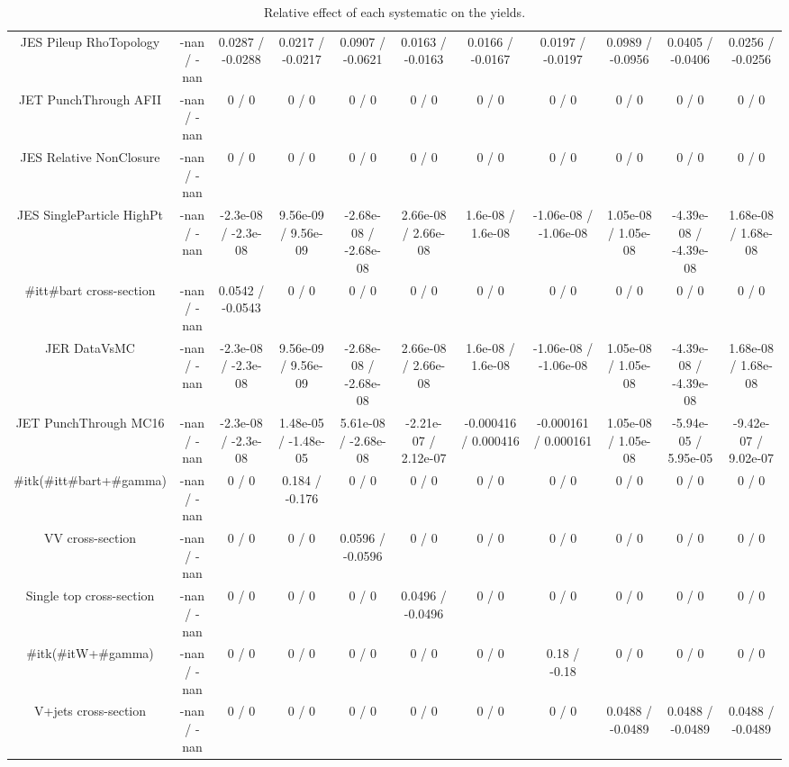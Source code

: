 \begin{table}[htbp]
\begin{center}
\begin{tabular}{|c|c|c|c|c|c|c|c|c|c|c|}
  JES Pileup RhoTopology & -nan / -nan & 0.0287 / -0.0288 & 0.0217 / -0.0217 & 0.0907 / -0.0621 & 0.0163 / -0.0163 & 0.0166 / -0.0167 & 0.0197 / -0.0197 & 0.0989 / -0.0956 & 0.0405 / -0.0406 & 0.0256 / -0.0256 \\ 
  JET PunchThrough AFII & -nan / -nan & 0 / 0 & 0 / 0 & 0 / 0 & 0 / 0 & 0 / 0 & 0 / 0 & 0 / 0 & 0 / 0 & 0 / 0 \\ 
  JES Relative NonClosure & -nan / -nan & 0 / 0 & 0 / 0 & 0 / 0 & 0 / 0 & 0 / 0 & 0 / 0 & 0 / 0 & 0 / 0 & 0 / 0 \\ 
  JES SingleParticle HighPt & -nan / -nan & -2.3e-08 / -2.3e-08 & 9.56e-09 / 9.56e-09 & -2.68e-08 / -2.68e-08 & 2.66e-08 / 2.66e-08 & 1.6e-08 / 1.6e-08 & -1.06e-08 / -1.06e-08 & 1.05e-08 / 1.05e-08 & -4.39e-08 / -4.39e-08 & 1.68e-08 / 1.68e-08 \\ 
  #it{t#bar{t}} cross-section & -nan / -nan & 0.0542 / -0.0543 & 0 / 0 & 0 / 0 & 0 / 0 & 0 / 0 & 0 / 0 & 0 / 0 & 0 / 0 & 0 / 0 \\ 
  JER DataVsMC & -nan / -nan & -2.3e-08 / -2.3e-08 & 9.56e-09 / 9.56e-09 & -2.68e-08 / -2.68e-08 & 2.66e-08 / 2.66e-08 & 1.6e-08 / 1.6e-08 & -1.06e-08 / -1.06e-08 & 1.05e-08 / 1.05e-08 & -4.39e-08 / -4.39e-08 & 1.68e-08 / 1.68e-08 \\ 
  JET PunchThrough MC16 & -nan / -nan & -2.3e-08 / -2.3e-08 & 1.48e-05 / -1.48e-05 & 5.61e-08 / -2.68e-08 & -2.21e-07 / 2.12e-07 & -0.000416 / 0.000416 & -0.000161 / 0.000161 & 1.05e-08 / 1.05e-08 & -5.94e-05 / 5.95e-05 & -9.42e-07 / 9.02e-07 \\ 
  #it{k}(#it{t#bar{t}+#gamma}) & -nan / -nan & 0 / 0 & 0.184 / -0.176 & 0 / 0 & 0 / 0 & 0 / 0 & 0 / 0 & 0 / 0 & 0 / 0 & 0 / 0 \\ 
  VV cross-section & -nan / -nan & 0 / 0 & 0 / 0 & 0.0596 / -0.0596 & 0 / 0 & 0 / 0 & 0 / 0 & 0 / 0 & 0 / 0 & 0 / 0 \\ 
  Single top cross-section & -nan / -nan & 0 / 0 & 0 / 0 & 0 / 0 & 0.0496 / -0.0496 & 0 / 0 & 0 / 0 & 0 / 0 & 0 / 0 & 0 / 0 \\ 
  #it{k}(#it{W+#gamma}) & -nan / -nan & 0 / 0 & 0 / 0 & 0 / 0 & 0 / 0 & 0 / 0 & 0.18 / -0.18 & 0 / 0 & 0 / 0 & 0 / 0 \\ 
  V+jets cross-section & -nan / -nan & 0 / 0 & 0 / 0 & 0 / 0 & 0 / 0 & 0 / 0 & 0 / 0 & 0.0488 / -0.0489 & 0.0488 / -0.0489 & 0.0488 / -0.0489 \\ 
\hline 
\end{tabular} 
\caption{Relative effect of each systematic on the yields.} 
\end{center} 
\end{table} 
